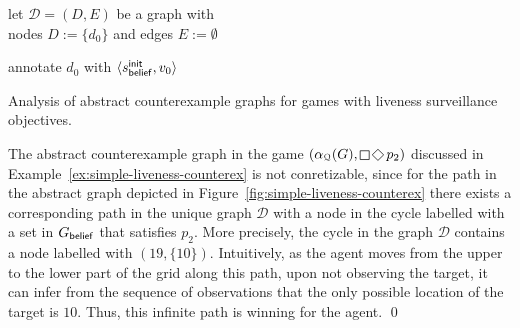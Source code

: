 \begin{algorithm}[h!] 

\smallskip

let $\mathcal D = (D,E)$ be a graph with\\
nodes $D := \{d_0\}$ and edges $E := \emptyset$\;

\smallskip

annotate $d_0$ with $\langle s_{\mathsf{belief}}^{\mathsf{init}}, v_0\rangle$\; 


{\KwRet{$\pi$;}\newline}
{}

\smallskip

\caption{Analysis of abstract counterexample graphs for games with liveness surveillance objectives.}
\label{algo:cex-analysis-liveness}
\end{algorithm}


\bigskip 

\begin{eg}\label{ex:simple-liveness-unconcretizable}
The abstract counterexample graph in the game $(\alpha_\partition(G),\LTLglobally \LTLfinally p_2)$ discussed in Example~\ref{ex:simple-liveness-counterex} is not conretizable, since for the path in the abstract graph depicted in Figure~\ref{fig:simple-liveness-counterex} there exists a corresponding path in the unique graph $\mathcal D$ with a node in the cycle labelled with a set in $G_{\mathsf{belief}}$ that satisfies $p_2$. More precisely, the cycle in the graph $\mathcal D$ contains a node labelled with $(19,\{10\})$. Intuitively, as the agent moves from the upper to the lower part of the grid along this path, upon not observing the target, it can infer from the sequence of observations that the only possible location of the target is $10$. Thus, this infinite path is winning for the agent.
\qed
\end{eg}

